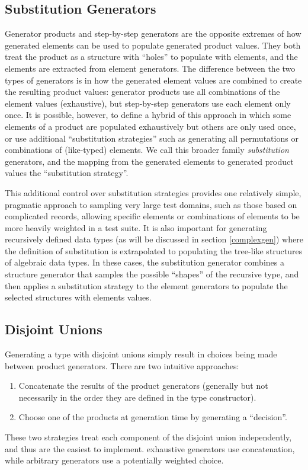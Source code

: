 \subsection{Substitution Generators}\label{sub:subgenops}
Generator products and step-by-step generators are the opposite extremes of 
how generated elements can be used to populate generated product values.
They both treat the product as a structure with ``holes'' to populate with elements,
and the elements are extracted from element generators.
The difference between the two types of generators is in
how the generated element values are combined
to create the resulting product values:
generator products use all combinations of the element values (exhaustive),
but step-by-step generators use each element only once.
It is possible, however, to define a hybrid of this approach
in which some elements of a product are populated exhaustively
but others are only used once,
or use additional ``substitution strategies'' such as generating 
all permutations or combinations of (like-typed) elements.
We call this broader family \emph{substitution} generators,
and the mapping from the generated elements to generated product values the ``substitution strategy''.

This additional control over substitution strategies 
provides one relatively simple, pragmatic approach to
sampling very large test domains,
such as those based on complicated records,
allowing specific elements or combinations of elements to be more heavily weighted in a test suite.
It is also important for generating recursively defined data types
(as will be discussed in section \ref{complexgen})
where the definition of substitution is extrapolated
to populating the tree-like structures of algebraic data types.
In these cases,
the substitution generator combines a structure generator that 
samples the possible ``shapes'' of the recursive type,
and then applies a substitution strategy to the element generators
to populate the selected structures with elements values.

\subsection{Disjoint Unions}

Generating a type with disjoint unions simply result in 
choices being made between product generators.
There are two intuitive approaches:

\begin{enumerate}
\item Concatenate the results of the product generators
(generally but not necessarily in the order they are defined in the type constructor).
\item Choose one of the products at generation time by generating a ``decision''.
\end{enumerate}
\noindent
These two strategies treat each component of the disjoint union independently,
and thus are the easiest to implement.
\SC exhaustive generators use concatenation,
while \QC arbitrary generators use a potentially weighted choice.

